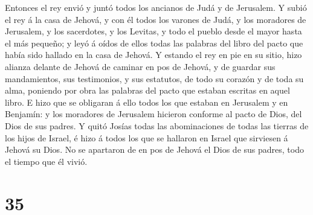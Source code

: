  Entonces el rey envió y juntó todos los ancianos de Judá y
de Jerusalem.  Y subió el rey á la casa de Jehová, y con él
todos los varones de Judá, y los moradores de Jerusalem, y los
sacerdotes, y los Levitas, y todo el pueblo desde el mayor hasta el más
pequeño; y leyó á oídos de ellos todas las palabras del libro del pacto
que había sido hallado en la casa de Jehová.  Y estando el
rey en pie en su sitio, hizo alianza delante de Jehová de caminar en pos
de Jehová, y de guardar sus mandamientos, sus testimonios, y sus
estatutos, de todo su corazón y de toda su alma, poniendo por obra las
palabras del pacto que estaban escritas en aquel libro.  E
hizo que se obligaran á ello todos los que estaban en Jerusalem y en
Benjamín: y los moradores de Jerusalem hicieron conforme al pacto de
Dios, del Dios de sus padres.  Y quitó Josías todas las
abominaciones de todas las tierras de los hijos de Israel, é hizo á
todos los que se hallaron en Israel que sirviesen á Jehová su Dios. No
se apartaron de en pos de Jehová el Dios de sus padres, todo el tiempo
que él vivió.

\hypertarget{section-34}{%
\section{35}\label{section-34}}

